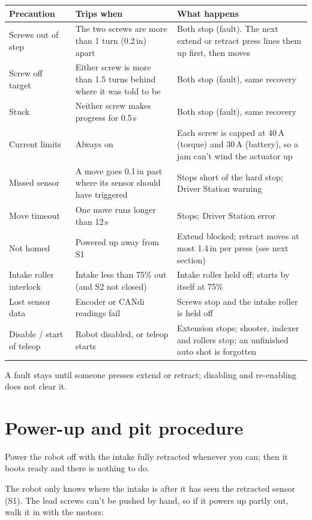 \documentclass[11pt]{article}
\begin{document}
\begin{xltabular}{\linewidth}{>{\raggedright\arraybackslash}p{3.0cm} L L}
\toprule
\textbf{Precaution} & \textbf{Trips when} & \textbf{What happens} \\
\midrule
\endhead
Screws out of step & The two screws are more than 1 turn (0.2\,in) apart & Both stop (fault). The next extend or retract press lines them up first, then moves \\
Screw off target & Either screw is more than 1.5 turns behind where it was told to be & Both stop (fault), same recovery \\
Stuck & Neither screw makes progress for 0.5\,s & Both stop (fault), same recovery \\
Current limits & Always on & Each screw is capped at 40\,A (torque) and 30\,A (battery), so a jam can't wind the actuator up \\
Missed sensor & A move goes 0.1\,in past where its sensor should have triggered & Stops short of the hard stop; Driver Station warning \\
Move timeout & One move runs longer than 12\,s & Stops; Driver Station error \\
Not homed & Powered up away from S1 & Extend blocked; retract moves at most 1.4\,in per press (see next section) \\
Intake roller interlock & Intake less than 75\% out (and S2 not closed) & Intake roller held off; starts by itself at 75\% \\
Lost sensor data & Encoder or CANdi readings fail & Screws stop and the intake roller is held off \\
Disable / start of teleop & Robot disabled, or teleop starts & Extension stops; shooter, indexer and rollers stop; an unfinished auto shot is forgotten \\
\bottomrule
\end{xltabular}

A fault stays until someone presses extend or retract; disabling and re-enabling does not clear
it.

\section*{Power-up and pit procedure}

Power the robot off with the intake fully retracted whenever you can; then it boots ready and
there is nothing to do.

The robot only knows where the intake is after it has seen the retracted sensor (S1). The lead
screws can't be pushed by hand, so if it powers up partly out, walk it in with the motors:
\end{document}
